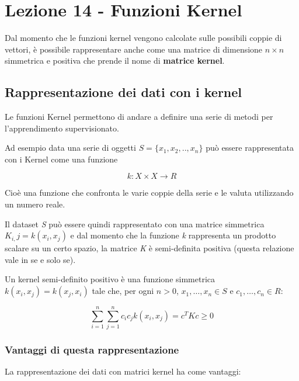 \section{Lezione 14 - Funzioni Kernel}\label{lezione-14---funzioni-kernel}

Dal momento che le funzioni kernel vengono calcolate sulle possibili coppie di vettori, è possibile rappresentare anche come una matrice di dimensione $n \times n$ simmetrica e positiva che prende il nome di \textbf{matrice kernel}.

\subsection{Rappresentazione dei dati con i kernel}\label{rappresentazione-dei-dati-con-i-kernel}

Le funzioni Kernel permettono di andare a definire una serie di metodi
per l'apprendimento supervisionato.

Ad esempio data una serie di oggetti $S = \{x_1,x_2,.., x_n\}$ può
essere rappresentata con i Kernel come una funzione

$$
k : X \times X \rightarrow R
$$

Cioè una funzione che confronta le varie coppie della serie e le valuta
utilizzando un numero reale.

Il dataset \emph{S} può essere quindi rappresentato con una matrice
simmetrica $K_{i,}j = k(x_i,x_j)$ e dal momento che la funzione
\emph{k} rappresenta un prodotto scalare su un certo spazio, la matrice
\emph{K} è semi-definita positiva (questa relazione vale in se e solo
se).

Un kernel semi-definito positivo è una funzione simmetrica $k(x_i,x_j) = k(x_j, x_i)$ tale che, per ogni $n > 0$, $x_1, \ldots, x_n \in S$ e $c_1, \ldots, c_n \in R$:

$$ \sum\limits_{i=1}^n \sum\limits_{j=1}^n c_i c_j k(x_i,x_j) = c^T K c \geq 0$$

\subsubsection{Vantaggi di questa rappresentazione}\label{vantaggi-di-questa-rappresentazione}

La rappresentazione dei dati con matrici kernel ha come vantaggi:

